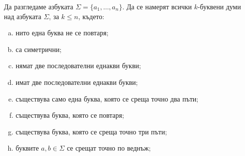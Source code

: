 \begin{problem}
  Да разгледаме азбуката $\Sigma = \{a_1,\dots,a_n\}$.
  Да се намерят всички $k$-буквени думи над азбуката $\Sigma$, за $k \leq n$, където:
  \begin{enumerate}[a)]
  \item
    нито една буква не се повтаря;
  \item
    са симетрични;
  \item
    нямат две последователни еднакви букви;
  \item
    имат две последователни еднакви букви;
  \item
    съществува само една буква, която се среща точно два пъти;
  \item
    съществува буква, която се повтаря;
  \item
    съществува буква, която се среща точно три пъти;
  \item
    буквите $a, b\in \Sigma$ се срещат точно по веднъж;
  \end{enumerate}
\end{problem}






